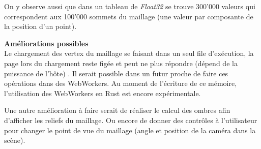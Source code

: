 On y observe aussi que dans un tableau de \textit{Float32} se trouve 300'000 valeurs qui correspondent aux 100'000 sommets du maillage (une valeur par composante de la position d'un point).

\textbf{Améliorations possibles} \\
Le chargement des vertex du maillage se faisant dans un seul file d'exécution,
la page lors du chargement reste figée et peut ne plus répondre (dépend de la
puissance de l'hôte) .
Il serait possible dans un futur proche de faire ces opérations dans des WebWorkers. Au
moment de l'écriture de ce mémoire, l'utilisation des WebWorkers
en Rust est encore expérimentale.

Une autre amélioration à faire serait de réaliser le calcul des ombres afin d'afficher les reliefs du maillage.
Ou encore de donner des contrôles à l'utilisateur pour changer le point 
de vue du maillage (angle et position de la caméra dans la scène).
